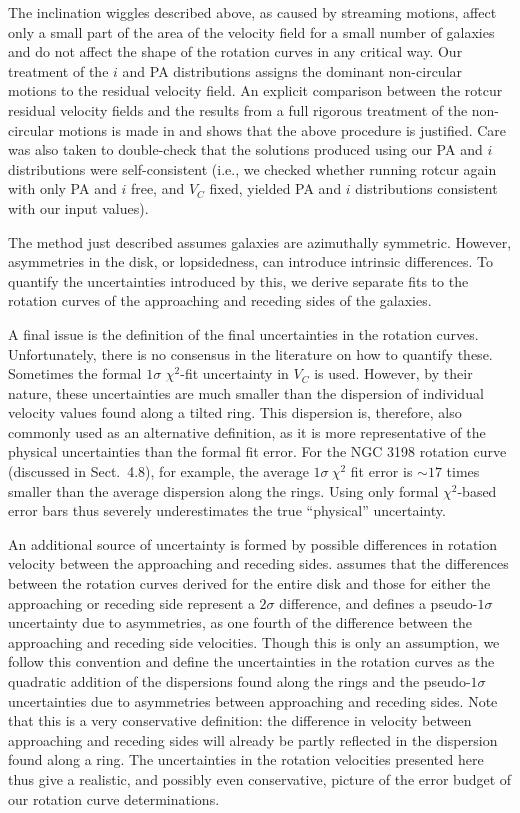 \documentclass[usenatbib,usegraphicx,apjfonts,floatfix]{emulateapj}
\begin{document}
The inclination wiggles described above, as caused by streaming
motions, affect only a small part of the area of the velocity field
for a small number of galaxies and do not affect the shape of the
rotation curves in any critical way. Our treatment of the $i$ and PA
distributions assigns the dominant non-circular motions to the
residual velocity field. An explicit comparison between the {\sc
  rotcur} residual velocity fields and the results from a full
rigorous treatment of the non-circular motions is made in
\citet{clemens2007} and shows that the above procedure is justified.
Care was also taken to double-check that the solutions produced using
our PA and $i$ distributions were self-consistent (i.e., we checked
whether running {\sc rotcur} again with only PA and $i$ free, and
$V_C$ fixed, yielded PA and $i$ distributions consistent with our
input values).

The method just described assumes galaxies are azimuthally symmetric.
However, asymmetries in the disk, or lopsidedness, can introduce
intrinsic differences.  To quantify the uncertainties introduced by
this, we derive separate fits to the rotation curves of the
approaching and receding sides of the galaxies.

A final issue is the definition of the final uncertainties in the rotation
curves. Unfortunately, there is no consensus in the literature on how
to quantify these.  Sometimes the formal $1\sigma$ $\chi^2$-fit
uncertainty in $V_C$ is used.  However, by their nature, these uncertainties
are much smaller than the dispersion of individual velocity values
found along a tilted ring.  This dispersion is, therefore, also
commonly used as an alternative definition, as it is more
representative of the physical uncertainties than the formal fit
error. For the NGC 3198 rotation curve (discussed in Sect.~4.8), for
example, the average $1\sigma\ \chi^2$ fit error is $\sim 17$ times
smaller than the average dispersion along the rings.  Using only
formal $\chi^2$-based error bars thus severely underestimates the true
``physical'' uncertainty.

An additional source of uncertainty is formed by possible differences
in rotation velocity between the approaching and receding sides.
\citet{swaters_phd} assumes that the differences between the rotation
curves derived for the entire disk and those for either the
approaching or receding side represent a $2\sigma$ difference, and
defines a pseudo-$1\sigma$ uncertainty due to asymmetries, as one
fourth of the difference between the approaching and receding side
velocities. Though this is only an assumption, we follow this
convention and define the uncertainties in the rotation curves as the
quadratic addition of the dispersions found along the rings and the
pseudo-$1\sigma$ uncertainties due to asymmetries between approaching
and receding sides. Note that this is a very conservative definition:
the difference in velocity between approaching and receding sides will
already be partly reflected in the dispersion found along a ring.
The uncertainties in the rotation velocities presented here thus give
a realistic, and possibly even conservative, picture of the error
budget of our rotation curve determinations.
\end{document}
